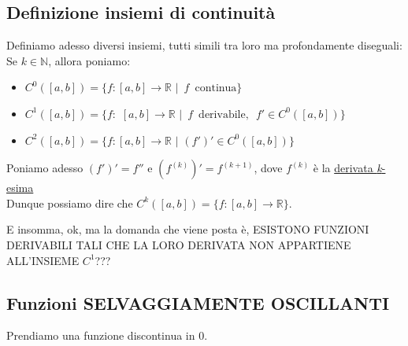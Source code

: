 \documentclass{article}
\theoremstyle{definition}
\newcommand{\R}{\mathbb{R}}
\newcommand{\N}{\mathbb{N}}
\begin{document}
\subsection{Definizione insiemi di continuità}
Definiamo adesso diversi insiemi, tutti simili tra loro ma profondamente diseguali:
\\
Se $k \in \N$, allora poniamo:
\begin{itemize}
    \item $C^0([a,b])=\{f:[a,b] \to \R \,\, |\,\,\, f \,\,\, \mbox{continua}\}$
    \item $C^1([a,b])=\{f: \,\, [a,b] \to \R \,\, | \,\,\, f \,\,\,\mbox{derivabile}, \,\,\, f' \in C^0([a,b])\}$
    \item $C^2([a,b])=\{f: [a,b] \to \R \,\, | \,\, (f')' \in C^0([a,b])\}$
\end{itemize}
Poniamo adesso $(f')'=f''$ e $(f^{(k)})'=f^{(k+1)}$, dove $f^{(k)}$ è la \underline{derivata \textit{k}-esima}
\\
Dunque possiamo dire che $C^k([a,b])=\{f: [a,b] \to \R\}$.
\\
\begin{center}
\end{center}
E insomma, ok, ma la domanda che viene posta è, ESISTONO FUNZIONI DERIVABILI TALI CHE LA LORO DERIVATA NON APPARTIENE ALL'INSIEME $C^1$???
\newpage
\subsection{Funzioni SELVAGGIAMENTE OSCILLANTI}
Prendiamo una funzione discontinua in 0.
\end{document}

